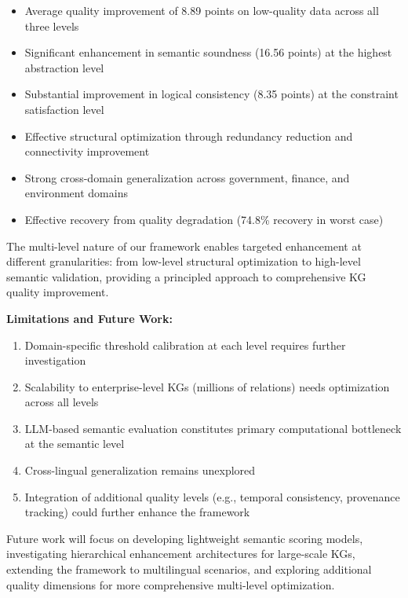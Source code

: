 \documentclass[runningheads]{llncs}
\begin{document}
\begin{itemize}
    \item Average quality improvement of 8.89 points on low-quality data across all three levels
    \item Significant enhancement in semantic soundness (16.56 points) at the highest abstraction level
    \item Substantial improvement in logical consistency (8.35 points) at the constraint satisfaction level
    \item Effective structural optimization through redundancy reduction and connectivity improvement
    \item Strong cross-domain generalization across government, finance, and environment domains
    \item Effective recovery from quality degradation (74.8\% recovery in worst case)
\end{itemize}

The multi-level nature of our framework enables targeted enhancement at different granularities: from low-level structural optimization to high-level semantic validation, providing a principled approach to comprehensive KG quality improvement.

\textbf{Limitations and Future Work:}
\begin{enumerate}
    \item Domain-specific threshold calibration at each level requires further investigation
    \item Scalability to enterprise-level KGs (millions of relations) needs optimization across all levels
    \item LLM-based semantic evaluation constitutes primary computational bottleneck at the semantic level
    \item Cross-lingual generalization remains unexplored
    \item Integration of additional quality levels (e.g., temporal consistency, provenance tracking) could further enhance the framework
\end{enumerate}

Future work will focus on developing lightweight semantic scoring models, investigating hierarchical enhancement architectures for large-scale KGs, extending the framework to multilingual scenarios, and exploring additional quality dimensions for more comprehensive multi-level optimization.
\end{document}
